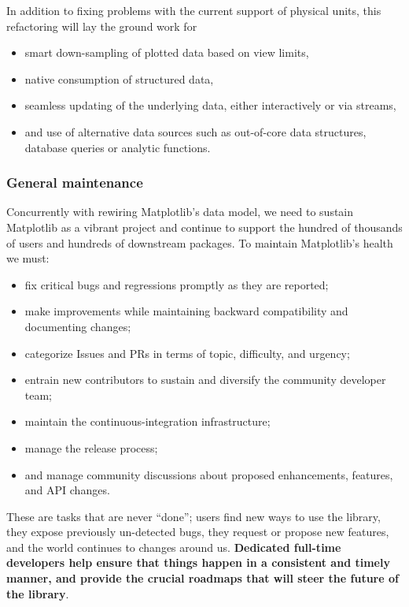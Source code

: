 \documentclass[12pt]{article}
\numberwithin{page}{section}
\begin{document}
In addition to fixing problems with the current
support of physical units, this refactoring will lay the ground work for
\begin{itemize}[noitemsep]
  \item smart down-sampling of plotted data based on view limits,
  \item native consumption of structured data,
  \item seamless updating of the underlying data, either interactively
    or via streams,
  \item and use of alternative data sources such as out-of-core data
    structures, database queries or analytic functions.
\end{itemize}

\subsubsection{General maintenance}

Concurrently with rewiring Matplotlib's data model,
we need to sustain Matplotlib as a vibrant project and
continue to support the hundred of thousands of users and hundreds of
downstream packages.  To maintain Matplotlib's health we must:
\begin{itemize}[noitemsep]
\item fix critical bugs and regressions promptly as they are reported;
\item make improvements while maintaining backward compatibility and
  documenting changes;
\item categorize Issues and PRs in terms of topic, difficulty, and
  urgency;
\item entrain new contributors to sustain and diversify the community
  developer team;
\item maintain the continuous-integration infrastructure;
\item manage the release process;
\item and manage community discussions about proposed enhancements, features,
  and API changes.
\end{itemize}
These are tasks that are never ``done''; users find new ways to use
the library, they expose previously un-detected bugs, they request or propose new
features, and the world continues to changes around us.   \textbf{Dedicated
full-time developers help ensure that things happen in a consistent and timely
manner, and provide the crucial roadmaps that will steer the future of the library}.
\end{document}
